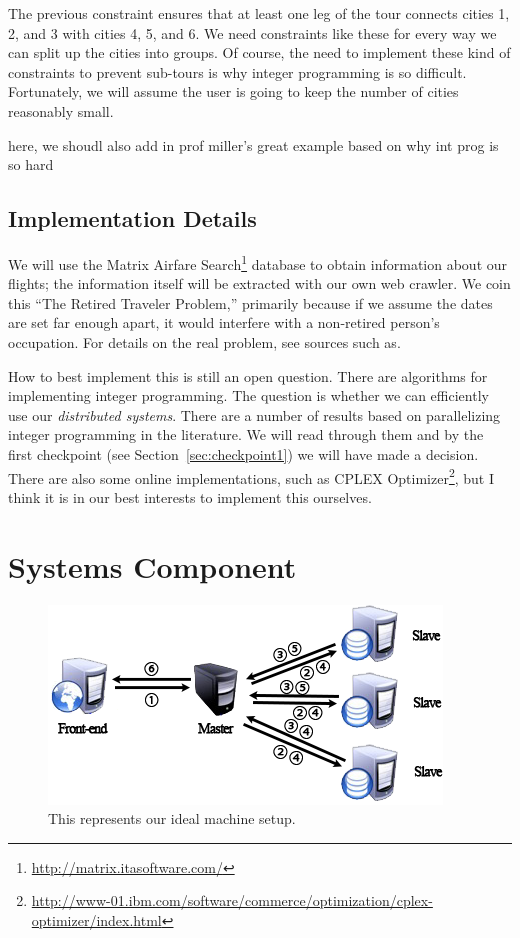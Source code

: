 \documentclass{article}
\begin{document}
The previous constraint ensures that at least one leg of the tour connects cities 1, 2, and 3 with cities 4, 5, and 6. We need constraints like these
for every way we can split up the cities into groups. Of course, the need to implement these kind of constraints to prevent sub-tours is why integer
programming is so difficult. Fortunately, we will assume the user is going to keep the number of cities reasonably small.

here, we shoudl also add in prof miller's great example based on why int prog is so hard


\subsection{Implementation Details}

We will use the Matrix Airfare Search\footnote{\url{http://matrix.itasoftware.com/}} database to obtain information about our flights; the information
itself will be extracted with our own web crawler. We coin this ``The Retired Traveler Problem,'' primarily because if we assume the dates are set far
enough apart, it would interfere with a non-retired person's occupation. For details on the real problem, see sources such as.

How to best implement this is still an open question. There are algorithms for implementing integer programming. The question is whether we
can efficiently use our \emph{distributed systems}. There are a number of results based on parallelizing integer programming in the literature. We
will read through them and by the first checkpoint (see Section~\ref{sec:checkpoint1}) we will have made a decision. There are also some online
implementations, such as CPLEX Optimizer\footnote{\url{http://www-01.ibm.com/software/commerce/optimization/cplex-optimizer/index.html}}, but I think
it is in our best interests to implement this ourselves.

\section{Systems Component}\label{sec:systems}

\begin{figure}[t]
\vskip 0.2in
\begin{center}
\centerline{\includegraphics[width=\columnwidth]{servers}}
\caption{This represents our ideal machine setup.}
\label{fig:machines}
\end{center}
\vskip -0.2in
\end{figure}
\end{document}
